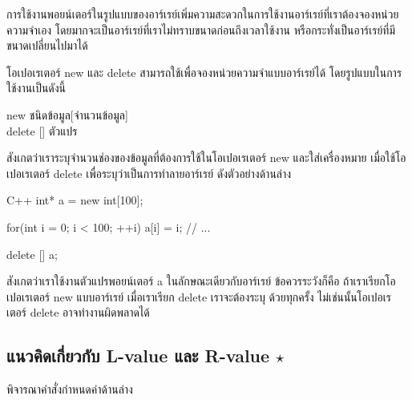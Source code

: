 การ{\wbr}ใช้{\wbr}งาน{\wbr}พอยน์เตอร์{\wbr}ใน{\wbr}รูปแบบ{\wbr}ของ{\wbr}อาร์เรย์{\wbr}เพิ่ม{\wbr}ความ{\wbr}สะดวก{\wbr}ใน{\wbr}การ{\wbr}ใช้{\wbr}งาน{\wbr}อาร์เรย์{\wbr}ที่{\wbr}เรา{\wbr}ต้อง{\wbr}จอง{\wbr}หน่วยความจำ{\wbr}เอง{\wbr}
โดยมาก{\wbr}จะ{\wbr}เป็น{\wbr}อาร์เรย์{\wbr}ที่{\wbr}เรา{\wbr}ไม่{\wbr}ทราบ{\wbr}ขนาด{\wbr}ก่อน{\wbr}ถึง{\wbr}เวลา{\wbr}ใช้{\wbr}งาน หรือ{\wbr}กระทั่ง{\wbr}เป็น{\wbr}อาร์เรย์{\wbr}ที่{\wbr}มี{\wbr}ขนาด{\wbr}เปลี่ยน{\wbr}ไป{\wbr}มา{\wbr}ได้{\wbr}

โอ{\wbr}เปอเรเตอร์ {\ct new} และ {\ct delete}
สามารถ{\wbr}ใช้{\wbr}เพื่อ{\wbr}จอง{\wbr}หน่วยความจำ{\wbr}แบบ{\wbr}อาร์เรย์{\wbr}ได้ โดย{\wbr}รูปแบบ{\wbr}ใน{\wbr}การ{\wbr}ใช้{\wbr}งาน{\wbr}เป็น{\wbr}ดังนี้{\wbr}

\begin{center}
{\ct new} ชนิด{\wbr}ข้อมูล[จำนวน{\wbr}ข้อมูล] \\
{\ct delete []} ตัวแปร{\wbr}
\end{center}

สังเกต{\wbr}ว่า{\wbr}เรา{\wbr}ระบุ{\wbr}จำนวน{\wbr}ช่อง{\wbr}ของ{\wbr}ข้อมูล{\wbr}ที่{\wbr}ต้องการ{\wbr}ใช้{\wbr}ใน{\wbr}โอ{\wbr}เปอเรเตอร์ {\ct new}
และ{\wbr}ใส่{\wbr}เครื่องหมาย {\ct []} เมื่อ{\wbr}ใช้{\wbr}โอ{\wbr}เปอเรเตอร์ {\ct delete}
เพื่อ{\wbr}ระบุ{\wbr}ว่า{\wbr}เป็น{\wbr}การ{\wbr}ทำลาย{\wbr}อาร์เรย์ ดัง{\wbr}ตัวอย่าง{\wbr}ด้าน{\wbr}ล่าง{\wbr}

\latintext
\begin{codelist}{C++}{}
  int* a = new int[100];

  for(int i = 0; i < 100; ++i) 
    a[i] = i;
  // ...

  delete [] a;
\end{codelist}
\thaitext

สังเกต{\wbr}ว่า{\wbr}เรา{\wbr}ใช้{\wbr}งาน{\wbr}ตัวแปร{\wbr}พอยน์เตอร์ {\ct a} ใน{\wbr}ลักษณะ{\wbr}เดียวกับ{\wbr}อาร์เรย์ ข้อ{\wbr}ควร{\wbr}ระวัง{\wbr}ก็{\wbr}คือ{\wbr}
ถ้า{\wbr}เรา{\wbr}เรียก{\wbr}โอ{\wbr}เปอเรเตอร์ {\ct new} แบบ{\wbr}อาร์เรย์ เมื่อ{\wbr}เรา{\wbr}เรียก {\ct delete}
เรา{\wbr}จะ{\wbr}ต้อง{\wbr}ระบุ {\ct []} ด้วย{\wbr}ทุก{\wbr}ครั้ง ไม่{\wbr}เช่นนั้น{\wbr}โอ{\wbr}เปอเรเตอร์ delete
อาจ{\wbr}ทำงาน{\wbr}ผิดพลาด{\wbr}ได้{\wbr}

\subsection{แนว{\wbr}คิด{\wbr}เกี่ยวกับ L-value และ R-value $\star$}
\label{sect:array-lval-rval}

พิจารณา{\wbr}คำสั่ง{\wbr}กำหนด{\wbr}ค่า{\wbr}ด้าน{\wbr}ล่าง{\wbr}

